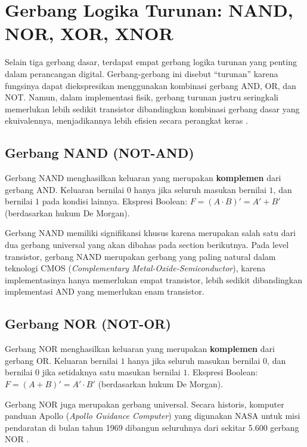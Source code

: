 \section{Gerbang Logika Turunan: NAND, NOR, XOR, XNOR}

Selain tiga gerbang dasar, terdapat empat gerbang logika turunan yang penting dalam perancangan digital. Gerbang-gerbang ini disebut ``turunan'' karena fungsinya dapat diekspresikan menggunakan kombinasi gerbang AND, OR, dan NOT. Namun, dalam implementasi fisik, gerbang turunan justru seringkali memerlukan lebih sedikit transistor dibandingkan kombinasi gerbang dasar yang ekuivalennya, menjadikannya lebih efisien secara perangkat keras \cite{allaboutcircuits_gates}.

\subsection{Gerbang NAND (NOT-AND)}

\begin{definisi}
Gerbang NAND menghasilkan keluaran yang merupakan \textbf{komplemen} dari gerbang AND. Keluaran bernilai $0$ hanya jika seluruh masukan bernilai $1$, dan bernilai $1$ pada kondisi lainnya. Ekspresi Boolean: $F = (A \cdot B)' = A' + B'$ (berdasarkan hukum De Morgan).
\end{definisi}

Gerbang NAND memiliki signifikansi khusus karena merupakan salah satu dari dua gerbang universal yang akan dibahas pada section berikutnya. Pada level transistor, gerbang NAND merupakan gerbang yang paling natural dalam teknologi CMOS (\textit{Complementary Metal-Oxide-Semiconductor}), karena implementasinya hanya memerlukan empat transistor, lebih sedikit dibandingkan implementasi AND yang memerlukan enam transistor.

\subsection{Gerbang NOR (NOT-OR)}

\begin{definisi}
Gerbang NOR menghasilkan keluaran yang merupakan \textbf{komplemen} dari gerbang OR. Keluaran bernilai $1$ hanya jika seluruh masukan bernilai $0$, dan bernilai $0$ jika setidaknya satu masukan bernilai $1$. Ekspresi Boolean: $F = (A + B)' = A' \cdot B'$ (berdasarkan hukum De Morgan).
\end{definisi}

Gerbang NOR juga merupakan gerbang universal. Secara historis, komputer panduan Apollo (\textit{Apollo Guidance Computer}) yang digunakan NASA untuk misi pendaratan di bulan tahun 1969 dibangun seluruhnya dari sekitar 5.600 gerbang NOR \cite{electronics_tutorials_gates}.

